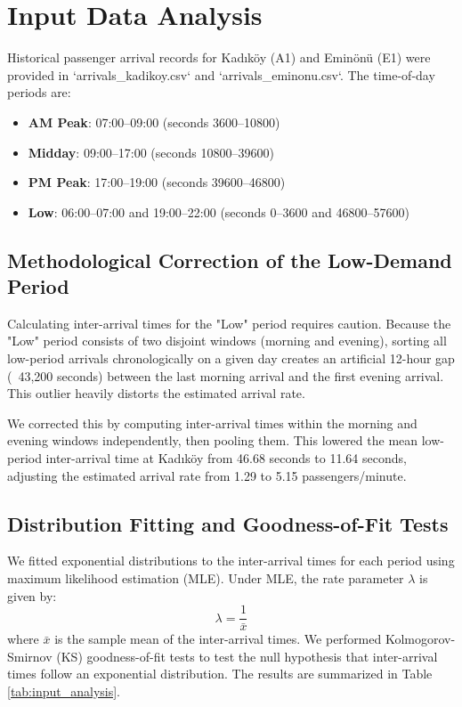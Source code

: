 \documentclass[11pt,a4paper]{article}
\begin{document}
\section{Input Data Analysis}
Historical passenger arrival records for Kad\i k\"{o}y (A1) and Emin\"{o}n\"{u} (E1) were provided in `arrivals_kadikoy.csv` and `arrivals_eminonu.csv`. The time-of-day periods are:
\begin{itemize}
    \item \textbf{AM Peak}: 07:00--09:00 (seconds 3600--10800)
    \item \textbf{Midday}: 09:00--17:00 (seconds 10800--39600)
    \item \textbf{PM Peak}: 17:00--19:00 (seconds 39600--46800)
    \item \textbf{Low}: 06:00--07:00 and 19:00--22:00 (seconds 0--3600 and 46800--57600)
\end{itemize}

\subsection{Methodological Correction of the Low-Demand Period}
Calculating inter-arrival times for the "Low" period requires caution. Because the "Low" period consists of two disjoint windows (morning and evening), sorting all low-period arrivals chronologically on a given day creates an artificial 12-hour gap (~43,200 seconds) between the last morning arrival and the first evening arrival. This outlier heavily distorts the estimated arrival rate. 

We corrected this by computing inter-arrival times within the morning and evening windows independently, then pooling them. This lowered the mean low-period inter-arrival time at Kad\i k\"{o}y from 46.68 seconds to 11.64 seconds, adjusting the estimated arrival rate from 1.29 to 5.15 passengers/minute.

\subsection{Distribution Fitting and Goodness-of-Fit Tests}
We fitted exponential distributions to the inter-arrival times for each period using maximum likelihood estimation (MLE). Under MLE, the rate parameter $\lambda$ is given by:
\begin{equation}
    \lambda = \frac{1}{\bar{x}}
\end{equation}
where $\bar{x}$ is the sample mean of the inter-arrival times. We performed Kolmogorov-Smirnov (KS) goodness-of-fit tests to test the null hypothesis that inter-arrival times follow an exponential distribution. The results are summarized in Table \ref{tab:input_analysis}.
\end{document}
